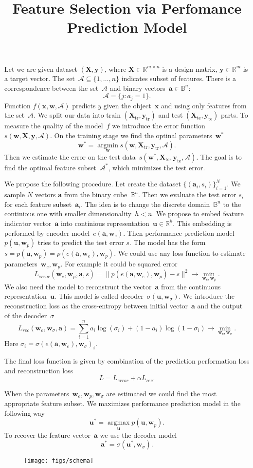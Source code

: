 \documentclass[12pt,twoside]{article}
\theoremstyle{definition}
\newcommand{\bX}{\mathbf{X}}
\newcommand{\ba}{\mathbf{a}}
\newcommand{\bx}{\mathbf{x}}
\newcommand{\by}{\mathbf{y}}
\newcommand{\bu}{\mathbf{u}}
\newcommand{\bw}{\mathbf{w}}
\newcommand{\cA}{\mathcal{A}}
\newcommand{\bbB}{\mathbb{B}}
\newcommand{\bbR}{\mathbb{R}}
\newcommand{\argmin}{\mathop{\arg \min}\limits}
\newcommand{\argmax}{\mathop{\arg \max}\limits}
\begin{document}
	
	\title{Feature Selection via Perfomance Prediction Model}
\date{}
\maketitle

Let we are given dataset $(\bX, \by)$, where $\bX \in \bbR^{m \times n}$ is a design matrix, $\by \in \bbR^m$ is a target vector. The set~$\cA \subseteq \{1, \dots, n\}$ indicates subset of features. 
There is a correspondence between the set~$\cA$ and binary vectors~$\ba \in \bbB^n$:
\[
	\cA = \{j: a_j = 1\}.
\]
Function $f(\bx, \bw, \cA)$ predicts $y$ given the object~$\bx$ and using only features from the set~$\cA$. 
We split our data into train $(\bX_{\text{tr}}, \by_{\text{tr}})$ and test $(\bX_{\text{te}}, \by_{\text{te}})$ parts. To measure the quality of the model~$f$ we introduce the error function~$s(\bw, \bX, \by, \cA)$. On the training stage we find the optinal parameters~$\bw^*$
\[
	\bw^* = \argmin_{\bw} s(\bw, \bX_{\text{tr}}, \by_{\text{tr}}, \cA).
\]
Then we estimate the error on the test data~$s(\bw^*, \bX_{\text{te}}, \by_{\text{te}}, \cA)$. 
The goal is to find the optimal feature subset~$\cA^*$, which minimizes the test error.  

We propose the following procedure. Let create the dataset $\{(\ba_i, s_i)\}_{i=1}^N$. We sample $N$ vectors $\ba$ from the binary cube~$\bbB^n$. Then we evaluate the test error $s_i$ for each feature subset~$\ba_i$. The idea is to change the discrete domain~$\bbB^n$ to the continious one with smaller dimensionality~$h < n$. We propose to embed feature indicator vector~$\ba$ into continious representation~$\bu \in \bbR^h$. This embedding is performed by encoder model~$e(\ba, \bw_e)$. Then performance prediction model~$p(\bu, \bw_p)$ tries to predict the test error $s$. The model has the form~$s=p(\bu, \bw_p) = p(e(\ba, \bw_e), \bw_p)$. We could use any loss function to estimate parameters~$\bw_e, \bw_p$. For example it could be squared error
\[
	L_{error}(\bw_e, \bw_p, \ba, s) = \| p(e(\ba, \bw_e), \bw_p) - s \| ^2 \rightarrow \min_{\bw_e, \bw_p}.
\]
We also need the model to reconstruct the vector~$\ba$ from the continuous representation~$\bu$. This model is called decoder~$\sigma(\bu, \bw_{\sigma})$. We introduce the reconstruction loss as the cross-entropy between initial vector~$\ba$ and the output of the decoder~$\sigma$
\[
	L_{rec}(\bw_e, \bw_\sigma, \ba) = \sum_{i=1}^n a_i \log(\sigma_i) + (1 - a_i) \log (1 - \sigma_i) \rightarrow \min_{\bw_e, \bw_\sigma}.
\]
Here $\sigma_i = \sigma(e(\ba, \bw_e), \bw_{\sigma})_i$.

The final loss function is given by combination of the prediction performation loss and reconstruction loss
\[
	L = L_{error} + \alpha L_{rec}.
\]

When the parameters~$\bw_e, \bw_p, \bw_\sigma$ are estimated we could find the most appropriate feature subset.
We maximizes performance prediction model in the following way
\[
	\bu^* = \argmax_{\bu} p(\bu, \bw_p).
\]
To recover the feature vector~$\ba$ we use the decoder model
\[
	\ba^* = \sigma(\bu^*, \bw_\sigma).
\]

\begin{figure}
	\centering
	\texttt{[image: figs/schema]}
\end{figure}
\end{document}
